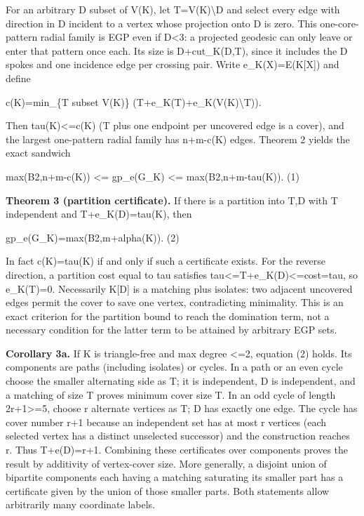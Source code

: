 \documentclass[
]{article}
\begin{document}
For an arbitrary D subset of V(K), let T=V(K)\textbackslash{}D and select every edge
with direction in D incident to a vertex whose projection onto D is
zero. This one-core-pattern radial family is EGP even if
\textbar D\textbar\textless3: a projected geodesic can only leave or
enter that pattern once each. Its size is
\textbar D\textbar+cut\_K(D,T), since it includes the
\textbar D\textbar{} spokes and one incidence edge per crossing pair.
Write e\_K(X)=\textbar E(K{[}X{]})\textbar{} and define

c(K)=min\_\{T subset V(K)\} (\textbar T\textbar+e\_K(T)+e\_K(V(K)\textbackslash{}T)).

Then tau(K)\textless=c(K) (T plus one endpoint per uncovered edge is a
cover), and the largest one-pattern radial family has n+m-c(K) edges.
Theorem 2 yields the exact sandwich

max(B2,n+m-c(K)) \textless= gp\_e(G\_K) \textless= max(B2,n+m-tau(K)).
(1)

\textbf{Theorem 3 (partition certificate).} If there is a partition into
T,D with T independent and \textbar T\textbar+e\_K(D)=tau(K), then

gp\_e(G\_K)=max(B2,m+alpha(K)). (2)

In fact c(K)=tau(K) if and only if such a certificate exists. For the
reverse direction, a partition cost equal to tau satisfies
tau\textless=\textbar T\textbar+e\_K(D)\textless=cost=tau, so e\_K(T)=0.
Necessarily K{[}D{]} is a matching plus isolates: two adjacent uncovered
edges permit the cover to save one vertex, contradicting minimality.
This is an exact criterion for the partition bound to reach the
domination term, not a necessary condition for the latter term to be
attained by arbitrary EGP sets.

\textbf{Corollary 3a.} If K is triangle-free and max degree \textless=2,
equation (2) holds. Its components are paths (including isolates) or
cycles. In a path or an even cycle choose the smaller alternating side
as T; it is independent, D is independent, and a matching of size
\textbar T\textbar{} proves minimum cover size \textbar T\textbar. In an
odd cycle of length 2r+1\textgreater=5, choose r alternate vertices as
T; D has exactly one edge. The cycle has cover number r+1 because an
independent set has at most r vertices (each selected vertex has a
distinct unselected successor) and the construction reaches r. Thus
\textbar T\textbar+e(D)=r+1. Combining these certificates over
components proves the result by additivity of vertex-cover size. More
generally, a disjoint union of bipartite components each having a
matching saturating its smaller part has a certificate given by the
union of those smaller parts. Both statements allow arbitrarily many
coordinate labels.
\end{document}
